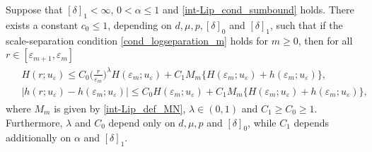 \documentclass[10pt,a4paper]{amsart}
\begin{document}
\begin{lemma}\label{int-Lip_prop_Hh}
    Suppose that $[\delta]_1<\infty$, $0<\alpha\leq 1$ and \eqref{int-Lip_cond_sumbound} holds. There exists a constant $c_0\leq 1$, depending on $d, \mu, p, [\delta]_0 $ and $[\delta]_1$, such that if the scale-separation condition \eqref{cond_logseparation_m} holds for $m\geq 0$, then for all $r\in [\varepsilon_{m+1}, \varepsilon_m]$
    \begin{align*}%
    \begin{split}
        & H(r; u_\varepsilon)\leq C_0 \Big(\frac{r}{\varepsilon_m}\Big)^\lambda H(\varepsilon_m; u_\varepsilon)+C_1M_m\{H(\varepsilon_m; u_\varepsilon)+h(\varepsilon_m; u_\varepsilon)\},\\
        & |h(r; u_\varepsilon)-h(\varepsilon_m; u_\varepsilon)|\leq C_0H(\varepsilon_m; u_\varepsilon)+C_1M_m\{H(\varepsilon_m; u_\varepsilon)+h(\varepsilon_m; u_\varepsilon)\},
    \end{split}
    \end{align*}
    where $M_m$ is given by \eqref{int-Lip_def_MN}, $\lambda\in(0, 1)$ and $C_1\geq C_0\geq 1$. Furthermore, $\lambda$ and $C_0$ depend only on $d, \mu, p $ and $[\delta]_0$, while $C_1$ depends additionally on $\alpha$ and $[\delta]_1$. 
\end{lemma}
\end{document}
